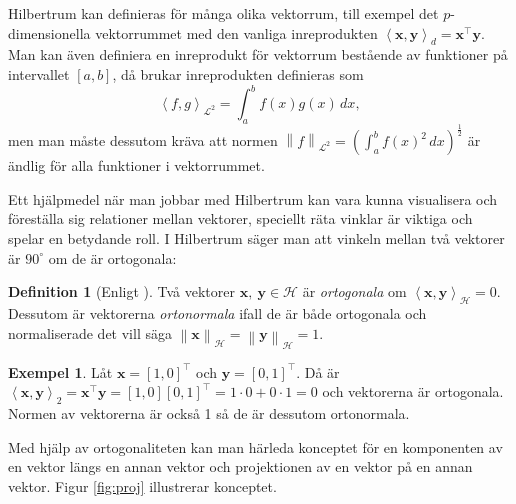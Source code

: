 \documentclass[a4paper, 12pt]{report}
\theoremstyle{definition}
\newtheorem{defi}{Definition}[section]
\newtheorem{ex}{Exempel}[section]
\theoremstyle{remark}
\newcommand{\bfx}{\mathbf{x}}
\newcommand{\bfy}{\mathbf{y}}
\newcommand{\llangle}{\left\langle}
\newcommand{\rrangle}{\right\rangle}
\newcommand{\inner}[2]{\llangle #1, #2 \rrangle}
\newcommand{\hil}{\mathcal{H}}
\begin{document}
Hilbertrum kan definieras för många olika vektorrum, till exempel det $p$-dimensionella vektorrummet med den vanliga inreprodukten $\left\langle \mathbf{x}, \mathbf{y} \right\rangle_d = \mathbf{x}^\intercal\mathbf{y}$.
Man kan även definiera en inreprodukt för vektorrum bestående av funktioner på intervallet $\left[a,b\right]$, då brukar inreprodukten definieras som
\begin{equation*}
\left\langle f, g\right\rangle_{\mathcal{L}^2}=\int_{a}^{b}f\left(x\right)g\left(x\right) \, dx ,
\end{equation*}
men man måste dessutom kräva att normen $\left\|f\right\|_{\mathcal{L}^2} = \left(\int_{a}^{b}f\left(x\right)^2\,dx\right)^{\frac{1}{2}}$ är ändlig för alla funktioner i vektorrummet.

Ett hjälpmedel när man jobbar med Hilbertrum kan vara kunna visualisera och föreställa sig relationer mellan vektorer, speciellt räta vinklar är viktiga och spelar en betydande roll. I Hilbertrum säger man att vinkeln mellan två vektorer är $90^\circ$ om de är ortogonala:


\begin{defi}[Enligt \cite{Lang}]
	Två vektorer $\bfx, ~\bfy\in\hil$ är \emph{ortogonala} om $\inner{\bfx}{\bfy}_\hil=0$. Dessutom är vektorerna \emph{ortonormala} ifall de är både ortogonala och normaliserade det vill säga $\left\|\bfx\right\|_\hil=\left\|\bfy\right\|_\hil=1$.
\end{defi}
\begin{ex}%
	Låt $\bfx=\left[1, 0\right]^\intercal$ och $\bfy=\left[0, 1\right]^\intercal$. Då är $\inner{\bfx}{\bfy}_2=\bfx^\intercal\bfy=\left[1, 0\right]\left[0, 1\right]^\intercal = 1\cdot0 + 0\cdot1=0$ och vektorerna är ortogonala. Normen av vektorerna är också 1 så de är dessutom ortonormala.
\end{ex}

Med hjälp av ortogonaliteten kan man härleda konceptet för en komponenten av en vektor längs en annan vektor och projektionen av en vektor på en annan vektor.
Figur \ref{fig:proj} illustrerar konceptet.
\end{document}
